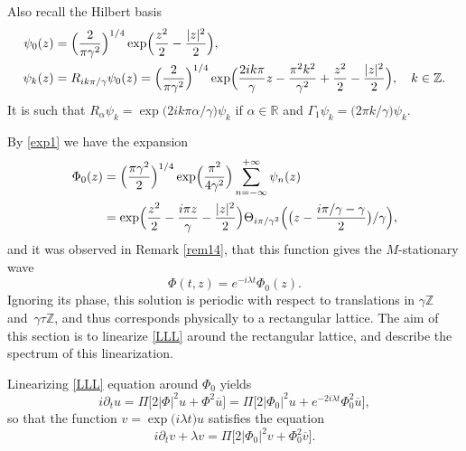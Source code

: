 \documentclass[10pt]{amsart}
\theoremstyle{definition}
\let\EE\exp
\let\ov\overline
\newcommand{\bpac}[1]{\bigl[#1\bigr]}
\begin{document}
Also recall the Hilbert basis
\begin{align*}
\psi_0(z)&=\Bigl(\frac{2}{\pi \gamma^2}\Bigr)^{1/4}\EE\Bigl(\frac{z^2}2-\frac{|z|^2}2\Bigr),\\
\psi_k(z)&=R_{{ik\pi}/{\gamma}}\psi_0(z)=\Bigl(\frac{2}{\pi \gamma^2}\Bigr)^{1/4}\EE\Bigl(\frac{2ik\pi} {\gamma} z -\frac{\pi^2k^2}{\gamma^2}+\frac{z^2}{2}-\frac{|z|^2}2\Bigr), \quad k \in \mathbb{Z}.
\end{align*}
It is such that $R_{\alpha}\psi_k=\EE\bigl({{2ik\pi \alpha}/ {\gamma}}\bigr) \psi_k$ if $\alpha \in \mathbb{R}$ and $\Gamma_1 \psi_k=\bigl({2 \pi k}/{\gamma} \bigr)\psi_k$.

By \eqref{exp1} we have the expansion
\begin{align*}
\Phi_0(z)&= \Bigl(\frac{\pi \gamma^2}{2}\Bigr)^{1/4} \EE\Bigl(\frac {\pi^2}{4\gamma^2}\Bigr) \sum_{n=-\infty}^{+\infty} \psi_n (z)\\
&=\EE\Bigl(\frac{z^2}2 -\frac{i\pi z} {\gamma} - \frac{|z|^2}2\Bigr) \Theta_{{i\pi}/{\gamma^2}}\Bigl({ \bigl({z-\frac{{i\pi}/{\gamma}-\gamma}2}}\bigr)/\gamma\Bigr),
\end{align*}
and it was observed in Remark \ref{rem14}, that this function gives the $M$-stationary wave
\[
\Phi(t,z) = e^{-i\lambda t}\Phi_0(z).
\]
Ignoring its phase, this solution is periodic with respect to translations in $\gamma \mathbb{Z}$ and~$\gamma \tau \mathbb{Z}$, and thus corresponds physically to a rectangular lattice.
The aim of this section is to linearize \eqref{LLL} around the rectangular lattice, and describe the spectrum of this linearization.

Linearizing \eqref{LLL} equation around $\Phi_0$ yields
\begin{equation}
i\partial_t u = \Pi\big[2|\Phi|^2u+\Phi^2\ov{u}\big] = \Pi\bpac{2|\Phi_0|^2u+e^{-2i\lambda t}\Phi_0^2\ov{u}},
\end{equation}
so that the function $v = \EE\bigl({i\lambda t}\bigr)u$ satisfies the equation
\begin{equation}\label{Lin_LLL}
i\partial_t v + \lambda v = \Pi\bpac{2|\Phi_0|^2v+\Phi_0^2\ov{v}}.
\end{equation}
\end{document}
